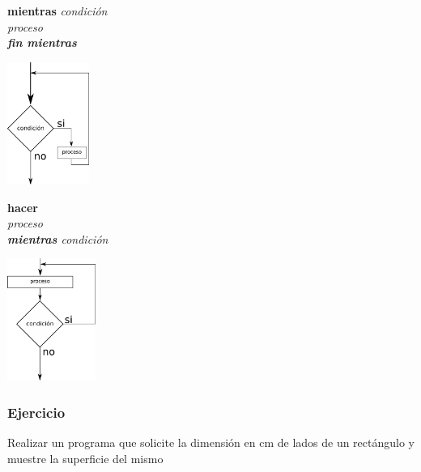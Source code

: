 \vspace{10mm}

\begin{minipage}{0.5\textwidth}
  \textbf{mientras} \it{condición} \\
  \hspace*{10mm}\it{proceso}\\
  \textbf{fin mientras}\\
\end{minipage}
\begin{minipage}{0.5\textwidth}
\center
  \includegraphics[height=40mm]{img/mientras.pdf}
\end{minipage}

\vspace{10mm}

\begin{minipage}{0.5\textwidth}
  \textbf{hacer} \\
  \hspace*{10mm}\it{proceso}\\
  \textbf{mientras} \it{condición}\\
\end{minipage}
\begin{minipage}{0.5\textwidth}
\center
  \includegraphics[height=40mm]{img/hacer_mientras.pdf}
\end{minipage}

\subsubsection{Ejercicio}
Realizar un programa que solicite la dimensión en cm de lados de un rectángulo y muestre la superficie del mismo


